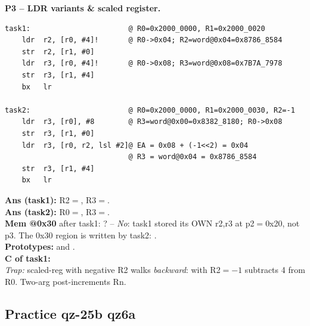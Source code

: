 \begin{qp}\textbf{P3 -- LDR variants \& scaled register.}
\begin{lstlisting}
task1:                       @ R0=0x2000_0000, R1=0x2000_0020
    ldr  r2, [r0, #4]!       @ R0->0x04; R2=word@0x04=0x8786_8584
    str  r2, [r1, #0]
    ldr  r3, [r0, #4]!       @ R0->0x08; R3=word@0x08=0x7B7A_7978
    str  r3, [r1, #4]
    bx   lr

task2:                       @ R0=0x2000_0000, R1=0x2000_0030, R2=-1
    ldr  r3, [r0], #8        @ R3=word@0x00=0x8382_8180; R0->0x08
    str  r3, [r1, #0]
    ldr  r3, [r0, r2, lsl #2]@ EA = 0x08 + (-1<<2) = 0x04
                             @ R3 = word@0x04 = 0x8786_8584
    str  r3, [r1, #4]
    bx   lr
\end{lstlisting}
\textbf{Ans (task1):} R2$=$, R3$=$.\\
\textbf{Ans (task2):} R0$=$, R3$=$.\\
\textbf{Mem @0x30} after task1: ? -- \emph{No}: task1 stored its OWN r2,r3 at p2$=$0x20, not p3. The 0x30 region is written by task2: .\\
\textbf{Prototypes:}  and .\\
\textbf{C of task1:} \\
\emph{Trap:} scaled-reg with negative R2 walks \emph{backward}: \asm{[R0,R2,LSL\#2]} with R2$=-1$ subtracts 4 from R0. Two-arg  post-increments Rn.
\end{qp}

\subsection{Practice qz-25b qz6a}

